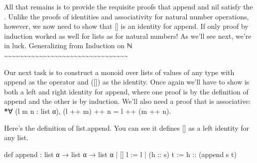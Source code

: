 \documentclass[letterpaper,10pt,english]{sphinxmanual}
\begin{document}
\sphinxAtStartPar
All that remains is to provide the requisite proofs that
append and nil satisfy the . Unlike the proofs
of identities and associativity for natural number operations,
however, we now need to show that {[}{]} is an identity for 
append. If only proof by induction worked as well for lists as
for natural numbers! As we’ll see next, we’re in luck.
Generalizing from Induction on ℕ
\textasciitilde{}\textasciitilde{}\textasciitilde{}\textasciitilde{}\textasciitilde{}\textasciitilde{}\textasciitilde{}\textasciitilde{}\textasciitilde{}\textasciitilde{}\textasciitilde{}\textasciitilde{}\textasciitilde{}\textasciitilde{}\textasciitilde{}\textasciitilde{}\textasciitilde{}\textasciitilde{}\textasciitilde{}\textasciitilde{}\textasciitilde{}\textasciitilde{}\textasciitilde{}\textasciitilde{}\textasciitilde{}\textasciitilde{}\textasciitilde{}\textasciitilde{}\textasciitilde{}\textasciitilde{}\textasciitilde{}\textasciitilde{}

\sphinxAtStartPar
Our next task is to construct a  monoid over
lists of values of any type with append as the 
operator and  ({[}{]}) as the identity. Once again
we’ll have to show \sphinxstyleemphasis{{[}{]}} is both a left and right identity
for append, where one proof is by the definition of append
and the other is by induction. We’ll also need a proof
that  is associative: {\color{red}\bfseries{}*}∀ (l m n : list α),
(l ++ m) ++ n = l ++ (m ++ n).

\sphinxAtStartPar
Here’s the definition of list.append.
You can see it defines {[}{]} as a left identity for any list.

\sphinxAtStartPar
def append : list α → list α → list α
| {[}{]}       l := l
| (h :: s) t := h :: (append s t)

\begin{sphinxVerbatim}[commandchars=\\\{\}]
                
 
 \PYG{o}{[}\PYG{o}{]}
\end{sphinxVerbatim}
\end{document}

